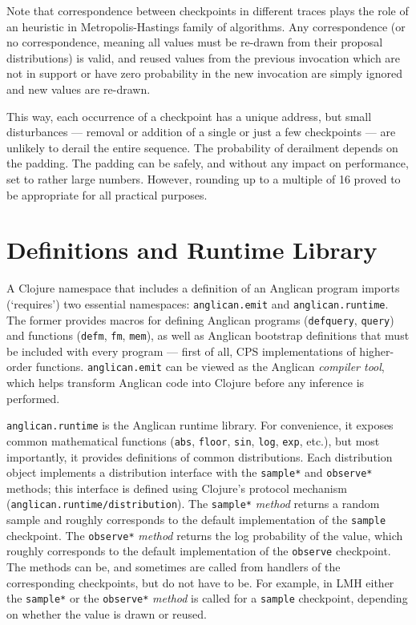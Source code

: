 \documentclass[sigconf]{acmart}
\begin{document}
Note that correspondence between checkpoints in different
traces plays the role of an heuristic in Metropolis-Hastings
family of algorithms. Any correspondence (or no correspondence,
meaning all values must be re-drawn from their proposal
distributions) is valid, and reused values from the previous
invocation which are not in support or have zero probability in
the new invocation are simply ignored and new values are
re-drawn.

This way, each occurrence of a checkpoint has a unique address,
but small disturbances --- removal or addition of a single or just
a few checkpoints --- are unlikely to derail the entire sequence.
The probability of derailment depends on the padding. The
padding can be safely, and without any impact on performance,
set to rather large numbers. However, rounding up to a multiple
of 16 proved to be appropriate for all practical purposes.
\iftoggle{full}{%

Function \texttt{checkpoint-id} in the
\texttt{anglican.inference} namespace automates generation of
checkpoint addresses and can be used from any inference
algorithm.
}{%
}%

\section{Definitions and Runtime Library}
\label{seq:runtime}

A Clojure namespace that includes a definition of an Anglican
program imports (`requires') two essential namespaces:
\texttt{anglican.emit} and \texttt{anglican.runtime}. The former
provides macros for defining Anglican programs
(\texttt{defquery}, \texttt{query}) and functions
(\texttt{defm}, \texttt{fm}, \texttt{mem}), as well as Anglican
bootstrap definitions that must be included with every program
--- first of all, CPS implementations of higher-order functions.
\texttt{anglican.emit} can be viewed as the Anglican
\textit{compiler tool}, which helps transform Anglican code into
Clojure before any inference is performed.

\texttt{anglican.runtime} is the Anglican runtime library. For
convenience, it exposes common mathematical functions
(\texttt{abs}, \texttt{floor}, \texttt{sin}, \texttt{log},
\texttt{exp}, etc.), but most importantly, it provides
definitions of common distributions. Each distribution object implements a
distribution interface with the \texttt{sample*} and \texttt{observe*} methods;
this interface is defined using Clojure's protocol mechanism
(\texttt{anglican.{\linebreak[0]}runtime/{\linebreak[0]}distribution}).
The \texttt{sample*} \textit{method} returns a random sample and
roughly corresponds to the default implementation of the \texttt{sample} checkpoint.
The \texttt{observe*} \textit{method} returns the log probability
of the value, which roughly corresponds to the default implementation of the \texttt{observe}
checkpoint. The methods can be, and sometimes are called from
handlers of the corresponding checkpoints, but do not have to
be. For example, in LMH either the \texttt{sample*} or
the \texttt{observe*} \textit{method} is called for a
\texttt{sample} checkpoint, depending on whether the value is
drawn or reused.
\end{document}
